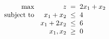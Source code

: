 \documentclass[a4paper, 10pt]{article}
\begin{document}
\newpage

\begin{subproblems_alpha}[start=2]
    \item
    \[
    \begin{array}{@{\hspace{2mm}} r @{\hspace{2mm}} r @{\hspace{2mm}} c @{\hspace{2mm}} l}
        \text{max } & z & = & 2x_1 + x_2 \\
        \text{subject to } & x_1 + x_2 & \leq & 4 \\
        & x_1 + 2x_2 & \leq & 6 \\
        & x_1, x_2 & \geq & 0
    \end{array}
    \]
\end{subproblems_alpha}
\end{document}

